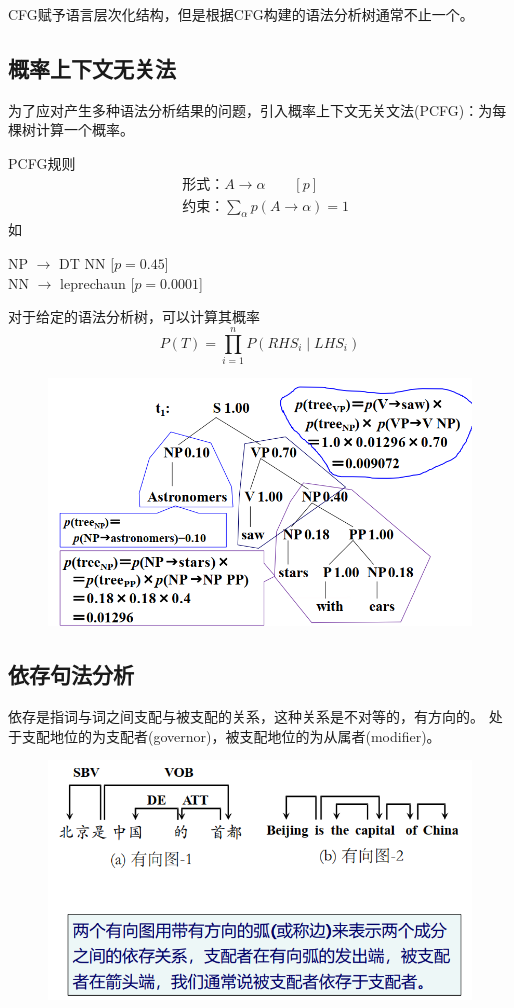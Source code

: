 CFG赋予语言层次化结构，但是根据CFG构建的语法分析树通常不止一个。

\subsection{概率上下文无关法}
为了应对产生多种语法分析结果的问题，引入概率上下文无关文法(PCFG)：为每棵树计算一个概率。

PCFG规则
\[\begin{aligned}
&\text{形式：}A\to\alpha\qquad [p]\\
&\text{约束：}\sum_\alpha p(A\to\alpha)=1
\end{aligned}\]
如
\begin{flushleft}
NP $\to$ DT NN [$p=0.45$]\\
NN $\to$ leprechaun [$p=0.0001$]
\end{flushleft}

对于给定的语法分析树，可以计算其概率
\[P(T)=\prod_{i=1}^nP(RHS_i\mid LHS_i)\]
\begin{figure}[H]
\centering
\includegraphics[width=0.6\linewidth]{fig/PCFG.png}
\end{figure}

\subsection{依存句法分析}
\begin{definition}[依存]
依存是指词与词之间支配与被支配的关系，这种关系是不对等的，有方向的。
处于支配地位的为支配者(governor)，被支配地位的为从属者(modifier)。
\end{definition}
\begin{figure}[H]
\centering
\includegraphics[width=0.6\linewidth]{fig/dependency_parser.png}
\end{figure}

